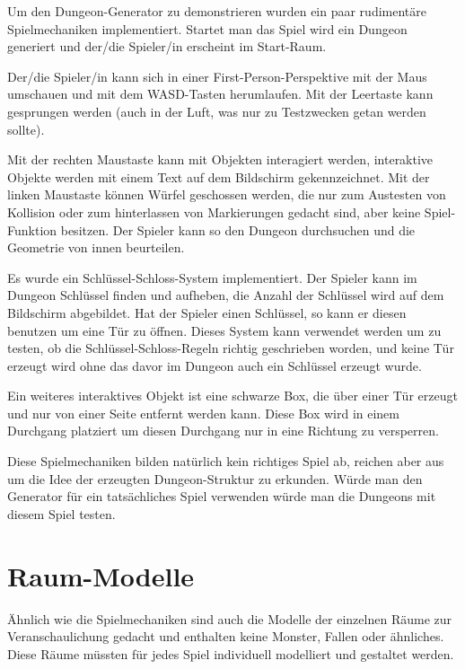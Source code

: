 Um den Dungeon-Generator zu demonstrieren wurden ein paar rudimentäre Spielmechaniken implementiert. Startet man das Spiel wird ein Dungeon generiert und der/die Spieler/in erscheint im Start-Raum.

Der/die Spieler/in kann sich in einer First-Person-Perspektive mit der Maus umschauen und mit dem WASD-Tasten herumlaufen. Mit der Leertaste kann gesprungen werden (auch in der Luft, was nur zu Testzwecken getan werden sollte).

Mit der rechten Maustaste kann mit Objekten interagiert werden, interaktive Objekte werden mit einem Text auf dem Bildschirm gekennzeichnet. Mit der linken Maustaste können Würfel geschossen werden, die nur zum Austesten von Kollision oder zum hinterlassen von Markierungen gedacht sind, aber keine Spiel-Funktion besitzen. Der Spieler kann so den Dungeon durchsuchen und die Geometrie von innen beurteilen. 

Es wurde ein Schlüssel-Schloss-System implementiert. Der Spieler kann im Dungeon Schlüssel finden und aufheben, die Anzahl der Schlüssel wird auf dem Bildschirm abgebildet. Hat der Spieler einen Schlüssel, so kann er diesen benutzen um eine Tür zu öffnen. Dieses System kann verwendet werden um zu testen, ob die Schlüssel-Schloss-Regeln richtig geschrieben worden, und keine Tür erzeugt wird ohne das davor im Dungeon auch ein Schlüssel erzeugt wurde.

Ein weiteres interaktives Objekt ist eine schwarze Box, die über einer Tür erzeugt und nur von einer Seite entfernt werden kann. Diese Box wird in einem Durchgang platziert um diesen Durchgang nur in eine Richtung zu versperren.

Diese Spielmechaniken bilden natürlich kein richtiges Spiel ab, reichen aber aus um die Idee der erzeugten Dungeon-Struktur zu erkunden. Würde man den Generator für ein tatsächliches Spiel verwenden würde man die Dungeons mit diesem Spiel testen.

\section{Raum-Modelle}

Ähnlich wie die Spielmechaniken sind auch die Modelle der einzelnen Räume zur Veranschaulichung gedacht und enthalten keine Monster, Fallen oder ähnliches. Diese Räume müssten für jedes Spiel individuell modelliert und gestaltet werden. 


